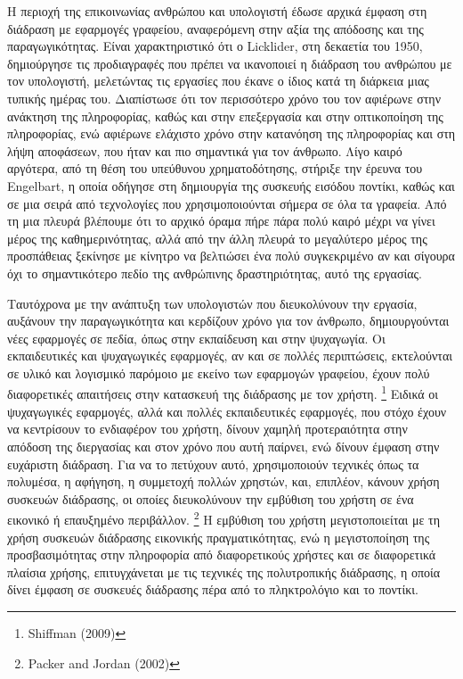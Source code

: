 \documentclass[
]{article}
\begin{document}
Η περιοχή της επικοινωνίας ανθρώπου και υπολογιστή έδωσε αρχικά έμφαση
στη διάδραση με εφαρμογές γραφείου, αναφερόμενη στην αξία της απόδοσης
και της παραγωγικότητας. Είναι χαρακτηριστικό ότι ο Licklider, στη
δεκαετία του 1950, δημιούργησε τις προδιαγραφές που πρέπει να ικανοποιεί
η διάδραση του ανθρώπου με τον υπολογιστή, μελετώντας τις εργασίες που
έκανε ο ίδιος κατά τη διάρκεια μιας τυπικής ημέρας του. Διαπίστωσε ότι
τον περισσότερο χρόνο του τον αφιέρωνε στην ανάκτηση της πληροφορίας,
καθώς και στην επεξεργασία και στην οπτικοποίηση της πληροφορίας, ενώ
αφιέρωνε ελάχιστο χρόνο στην κατανόηση της πληροφορίας και στη λήψη
αποφάσεων, που ήταν και πιο σημαντικά για τον άνθρωπο. Λίγο καιρό
αργότερα, από τη θέση του υπεύθυνου χρηματοδότησης, στήριξε την έρευνα
του Engelbart, η οποία οδήγησε στη δημιουργία της συσκευής εισόδου
ποντίκι, καθώς και σε μια σειρά από τεχνολογίες που χρησιμοποιούνται
σήμερα σε όλα τα γραφεία. Από τη μια πλευρά βλέπουμε ότι το αρχικό όραμα
πήρε πάρα πολύ καιρό μέχρι να γίνει μέρος της καθημερινότητας, αλλά από
την άλλη πλευρά το μεγαλύτερο μέρος της προσπάθειας ξεκίνησε με κίνητρο
να βελτιώσει ένα πολύ συγκεκριμένο αν και σίγουρα όχι το σημαντικότερο
πεδίο της ανθρώπινης δραστηριότητας, αυτό της εργασίας.

Ταυτόχρονα με την ανάπτυξη των υπολογιστών που διευκολύνουν την εργασία,
αυξάνουν την παραγωγικότητα και κερδίζουν χρόνο για τον άνθρωπο,
δημιουργούνται νέες εφαρμογές σε πεδία, όπως στην εκπαίδευση και στην
ψυχαγωγία. Οι εκπαιδευτικές και ψυχαγωγικές εφαρμογές, αν και σε πολλές
περιπτώσεις, εκτελούνται σε υλικό και λογισμικό παρόμοιο με εκείνο των
εφαρμογών γραφείου, έχουν πολύ διαφορετικές απαιτήσεις στην κατασκευή
της διάδρασης με τον χρήστη. \footnote{Shiffman (2009)} Ειδικά οι
ψυχαγωγικές εφαρμογές, αλλά και πολλές εκπαιδευτικές εφαρμογές, που
στόχο έχουν να κεντρίσουν το ενδιαφέρον του χρήστη, δίνουν χαμηλή
προτεραιότητα στην απόδοση της διεργασίας και στον χρόνο που αυτή
παίρνει, ενώ δίνουν έμφαση στην ευχάριστη διάδραση. Για να το πετύχουν
αυτό, χρησιμοποιούν τεχνικές όπως τα πολυμέσα, η αφήγηση, η συμμετοχή
πολλών χρηστών, και, επιπλέον, κάνουν χρήση συσκευών διάδρασης, οι
οποίες διευκολύνουν την εμβύθιση του χρήστη σε ένα εικονικό ή επαυξημένο
περιβάλλον. \footnote{Packer and Jordan (2002)} Η εμβύθιση του χρήστη
μεγιστοποιείται με τη χρήση συσκευών διάδρασης εικονικής
πραγματικότητας, ενώ η μεγιστοποίηση της προσβασιμότητας στην πληροφορία
από διαφορετικούς χρήστες και σε διαφορετικά πλαίσια χρήσης,
επιτυγχάνεται με τις τεχνικές της πολυτροπικής διάδρασης, η οποία δίνει
έμφαση σε συσκευές διάδρασης πέρα από το πληκτρολόγιο και το ποντίκι.
\end{document}
